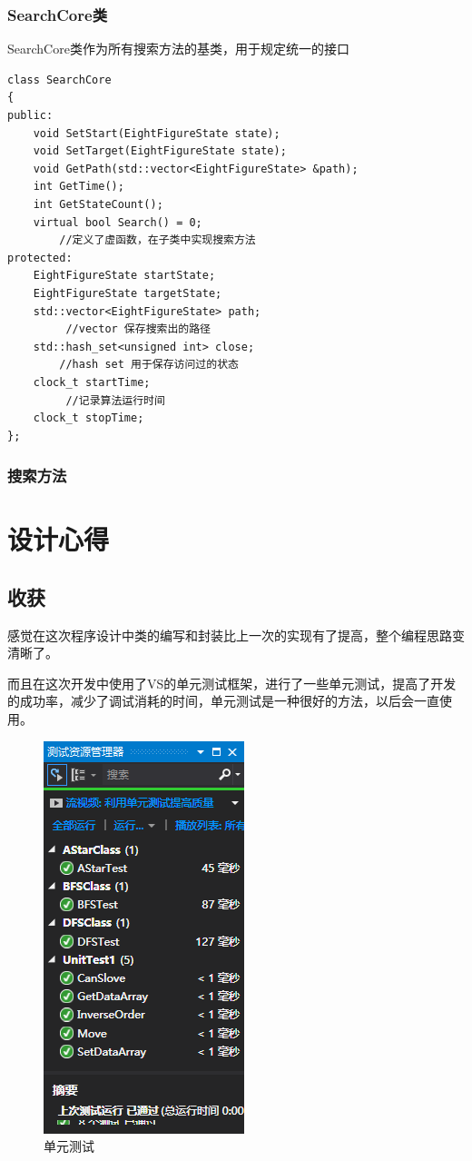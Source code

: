 \documentclass[12pt,a4paper]{article}
\begin{document}
\subsubsection{SearchCore类}
SearchCore类作为所有搜索方法的基类，用于规定统一的接口
\begin{lstlisting}
class SearchCore
{
public:
    void SetStart(EightFigureState state);
    void SetTarget(EightFigureState state);
    void GetPath(std::vector<EightFigureState> &path);
    int GetTime();
    int GetStateCount();
    virtual bool Search() = 0;			
    	//定义了虚函数，在子类中实现搜索方法
protected:
    EightFigureState startState;
    EightFigureState targetState;
    std::vector<EightFigureState> path;		
   		 //vector 保存搜索出的路径
    std::hash_set<unsigned int> close;			
    	//hash set 用于保存访问过的状态
    clock_t startTime;									
   		 //记录算法运行时间
    clock_t stopTime;
};
\end{lstlisting}
\subsubsection{搜索方法}

\section{设计心得}
\subsection{收获}
感觉在这次程序设计中类的编写和封装比上一次的实现有了提高，整个编程思路变清晰了。\par
而且在这次开发中使用了VS的单元测试框架，进行了一些单元测试，提高了开发的成功率，减少了调试消耗的时间，单元测试是一种很好的方法，以后会一直使用。
\begin{figure}[H]
\centering
\includegraphics{2.png}
\caption{单元测试} 
\end{figure}
\end{document}
